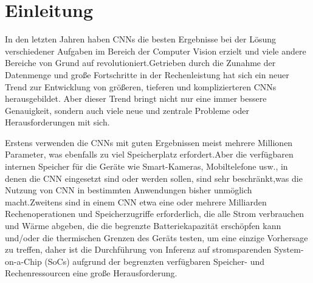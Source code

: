 \documentclass[12pt,a4paper]{scrartcl}
\numberwithin{equation}{section}
\begin{document}
  \pagestyle{headings}
 \newpage
%
\begin{acronym}[THIBAUT]
\end{acronym}
\newpage
\section{Einleitung}
In den letzten Jahren haben \acsp{CNN} die besten Ergebnisse bei der Lösung verschiedener Aufgaben im Bereich der Computer Vision erzielt und viele andere Bereiche von Grund auf revolutioniert.Getrieben durch die Zunahme der Datenmenge und große Fortschritte in der Rechenleistung hat sich ein neuer Trend zur Entwicklung von größeren, tieferen und komplizierteren \acsp{CNN} herausgebildet. Aber dieser Trend bringt nicht nur eine immer bessere Genauigkeit, sondern auch viele neue und zentrale Probleme oder Herausforderungen mit sich.


Erstens verwenden die \acsp{CNN} mit guten Ergebnissen meist mehrere Millionen Parameter, was ebenfalls zu viel Speicherplatz erfordert.Aber die verfügbaren internen Speicher für die Geräte wie Smart-Kameras, Mobiltelefone usw., in denen die CNN eingesetzt sind oder werden sollen, sind sehr beschränkt,was die Nutzung von CNN in bestimmten Anwendungen bisher unmöglich macht.Zweitens sind in einem CNN  etwa eine oder mehrere Milliarden Rechenoperationen und Speicherzugriffe erforderlich, die alle Strom verbrauchen und Wärme abgeben, die die begrenzte Batteriekapazität erschöpfen kann und/oder die thermischen Grenzen des Geräts testen, um eine einzige Vorhersage zu treffen\cite{prunetoprune}, daher ist die Durchführung von Inferenz auf stromsparenden System-on-a-Chip (SoCs) aufgrund der begrenzten verfügbaren Speicher- und Rechenressourcen eine große Herausforderung.
\end{document}
